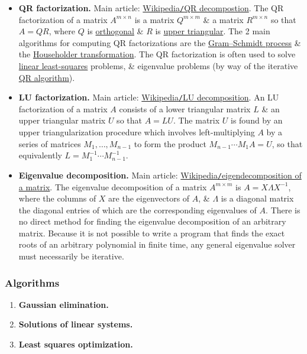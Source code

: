 \documentclass{article}
\begin{document}
\begin{itemize}
	\item {\bf QR factorization.} Main article: \href{https://en.wikipedia.org/wiki/QR_decomposition}{Wikipedia{\tt/}QR decompostion}. The QR factorization of a matrix $A^{m\times n}$ is a matrix $Q^{m\times m}$ \& a matrix $R^{m\times n}$ so that $A = QR$, where $Q$ is \href{https://en.wikipedia.org/wiki/Orthogonal_matrix}{orthogonal} \& $R$ is \href{https://en.wikipedia.org/wiki/Triangular_matrix}{upper triangular}. The 2 main algorithms for computing QR factorizations are the \href{https://en.wikipedia.org/wiki/Gram%E2%80%93Schmidt_process}{Gram--Schmidt process} \& the \href{https://en.wikipedia.org/wiki/Householder_transformation}{Householder transformation}. The QR factorization is often used to solve \href{https://en.wikipedia.org/wiki/Linear_least-squares}{linear least-squares} problems, \& eigenvalue problems (by way of the iterative \href{https://en.wikipedia.org/wiki/QR_algorithm}{QR algorithm}).
	\item {\bf LU factorization.} Main article: \href{https://en.wikipedia.org/wiki/LU_decomposition}{Wikipedia{\tt/}LU decomposition}. An LU factorization of a matrix $A$ consists of a lower triangular matrix $L$ \& an upper triangular matrix $U$ so that $A = LU$. The matrix $U$ is found by an upper triangularization procedure which involves left-multiplying $A$ by a series of matrices $M_1,\ldots,M_{n-1}$ to form the product $M_{n-1}\cdots M_1A = U$, so that equivalently $L = M_1^{-1}\cdots M_{n-1}^{-1}$.
	\item {\bf Eigenvalue decomposition.} Main article: \href{https://en.wikipedia.org/wiki/Eigendecomposition_of_a_matrix}{Wikipedia{\tt/}eigendecomposition of a matrix}. The eigenvalue decomposition of a matrix $A^{m\times m}$ is $A = X\Lambda X^{-1}$, where the columns of $X$ are the eigenvectors of $A$, \& $\Lambda$ is a diagonal matrix the diagonal entries of which are the corresponding eigenvalues of $A$. There is no direct method for finding the eigenvalue decomposition of an arbitrary matrix. Because it is not possible to write a program that finds the exact roots of an arbitrary polynomial in finite time, any general eigenvalue solver must necessarily be iterative.
\end{itemize}

\subsubsection{Algorithms}

\begin{enumerate}
	\item {\bf Gaussian elimination.}
	\item {\bf Solutions of linear systems.}
	\item {\bf Least squares optimization.}
\end{enumerate}
\end{document}
